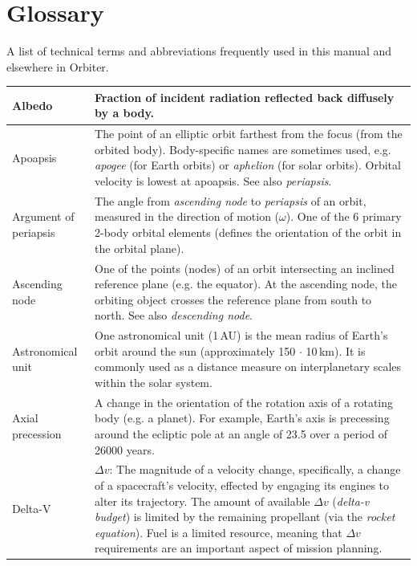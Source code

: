 \documentclass[Orbiter User Manual.tex]{subfiles}
\begin{document}
\section{Glossary}
A list of technical terms and abbreviations frequently used in this manual and
elsewhere in Orbiter.

	\footnotesize
	\begin{longtable}{ >{\RaggedRight}p{} p{} }
	\hline%
	Albedo & Fraction of incident radiation reflected back diffusely by a body.\\
	\hline
	Apoapsis & The point of an elliptic orbit farthest from the focus (from the
		orbited body). Body-specific names are sometimes used, e.g.
		\emph{apogee} (for Earth orbits) or \emph{aphelion} (for solar orbits).
		Orbital velocity is lowest at apoapsis. See also \emph{periapsis}.\\
	\hline
	Argument of periapsis & The angle from \textit{ascending node} to
		\emph{periapsis} of an orbit, measured in the direction of motion
		($\omega$). One of the 6 primary 2-body orbital elements (defines the
		orientation of the orbit in the orbital plane).\\
	\hline
	Ascending node & One of the points (nodes) of an orbit intersecting an
		inclined reference plane (e.g. the equator). At the ascending node, the
		orbiting object crosses the reference plane from south to north. See
		also \emph{descending node}.\\
	\hline
	Astronomical unit & One astronomical unit (1\,AU) is the mean radius of
		Earth's orbit around the sun (approximately 150 $\cdot$
		10\textsup{6}\,km). It is commonly used as a distance measure on
		interplanetary scales within the solar system.\\
	\hline
	Axial precession & A change in the orientation of the rotation axis of a
		rotating body (e.g. a planet). For example, Earth's axis is precessing
		around the ecliptic pole at an angle of 23.5\deg{} over a period of
		26000 years.\\
	\hline
	Delta-V & $\Delta v$: The magnitude of a velocity change, specifically, a
		change of a spacecraft's velocity, effected by engaging its engines to
		alter its trajectory. The amount of available $\Delta v$ (\emph{delta-v
		budget}) is limited by the remaining propellant (via the \emph{rocket
		equation}). Fuel is a limited resource, meaning that $\Delta v$
		requirements are an important aspect of mission planning.\\

\end{longtable}
\end{document}
